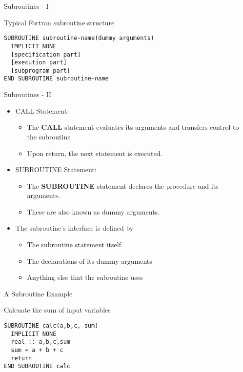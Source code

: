 \begin{frame}[fragile]{Subroutines - I}
\begin{block}{Typical Fortran subroutine structure}
\begin{lstlisting}
SUBROUTINE subroutine-name(dummy arguments)
  IMPLICIT NONE
  [specification part]
  [execution part]
  [subprogram part]
END SUBROUTINE subroutine-name
\end{lstlisting}
\end{block}
\end{frame}

\begin{frame}[fragile]{Subroutines - II}
\begin{itemize}
 \item CALL Statement:
 \begin{itemize}
  \item The  \textbf{CALL} statement evaluates its arguments and transfers control to the subroutine
  \item Upon return, the next statement is executed.  
 \end{itemize}
 \item SUBROUTINE Statement:
 \begin{itemize}
  \item The \textbf{SUBROUTINE} statement declares the procedure and its arguments.
  \item These are also known as dummy arguments.
 \end{itemize}
 \item The subroutine’s interface is defined by
 \begin{itemize}
  \item The subroutine statement itself
  \item The declarations of its dummy arguments
  \item Anything else that the subroutine uses
 \end{itemize}
\end{itemize}
\end{frame}


\begin{frame}[fragile]{A Subroutine Example}
\begin{block}{Calcuate the sum of input variables}
\begin{lstlisting}
SUBROUTINE calc(a,b,c, sum)
  IMPLICIT NONE
  real :: a,b,c,sum
  sum = a + b + c
  return
END SUBROUTINE calc
\end{lstlisting}
\end{block}
\end{frame}


